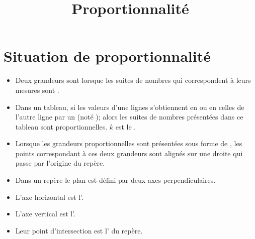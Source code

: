 \documentclass[12pt,a4paper]{article}
\date{}
\title{Proportionnalité}
\begin{document}
\maketitle

\section{Situation de proportionnalité}

\begin{mydefs}
	\begin{itemize}
		\item 	Deux grandeurs sont  lorsque les suites de nombres qui correspondent à leurs mesures sont .
		
		\item Dans un tableau, si les valeurs d'une lignes s'obtiennent en  ou en  celles de l'autre ligne par un  (noté ); alors les suites de nombres présentées dans ce tableau sont proportionnelles. $k$ est le  .
		
		\item Lorsque les grandeurs proportionnelles sont présentées sous forme de , les points correspondant à ces deux grandeurs sont alignés sur une droite qui passe par l'origine du repère. 
		
	\end{itemize}

	
\end{mydefs}

\begin{myraps}
	\begin{itemize}
		\item Dans un repère  le plan est défini par deux axes perpendiculaires.
		\item L'axe horizontal est l'.
		\item L'axe vertical est l'.
		\item Leur point d'intersection est l' du repère.
	\end{itemize}
\end{myraps}


\end{document}
